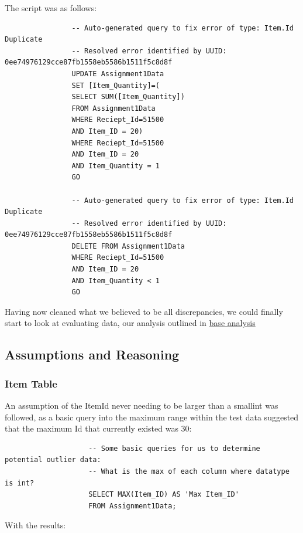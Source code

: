 \documentclass{article}
\begin{document}
            \newpage

            The script was as follows:
            \begin{lstlisting}
                -- Auto-generated query to fix error of type: Item.Id Duplicate
                -- Resolved error identified by UUID: 0ee74976129cce87fb1558eb5586b1511f5c8d8f
                UPDATE Assignment1Data 
                SET [Item_Quantity]=(
                SELECT SUM([Item_Quantity])
                FROM Assignment1Data
                WHERE Reciept_Id=51500
                AND Item_ID = 20)
                WHERE Reciept_Id=51500
                AND Item_ID = 20
                AND Item_Quantity = 1
                GO

                -- Auto-generated query to fix error of type: Item.Id Duplicate
                -- Resolved error identified by UUID: 0ee74976129cce87fb1558eb5586b1511f5c8d8f
                DELETE FROM Assignment1Data 
                WHERE Reciept_Id=51500
                AND Item_ID = 20
                AND Item_Quantity < 1
                GO
            \end{lstlisting}

            Having now cleaned what we believed to be all discrepancies, we could finally start to look at
            evaluating data, our analysis outlined in \hyperref[sec:BA]{\color{blue}base analysis}
        \newpage
        \subsection{Assumptions and Reasoning}
        \label{sec:AR}
            \subsubsection{Item Table}
                An assumption of the ItemId never needing to be larger than a smallint
                was followed, as a basic query into the maximum range within the test data
                suggested that the maximum Id that currently existed was 30:
                \begin{lstlisting}
                    -- Some basic queries for us to determine potential outlier data:
                    -- What is the max of each column where datatype is int?
                    SELECT MAX(Item_ID) AS 'Max Item_ID'
                    FROM Assignment1Data;
                \end{lstlisting}

                With the results:
\end{document}
